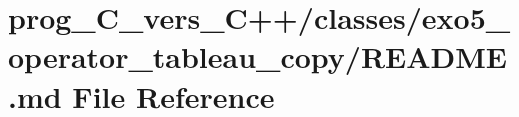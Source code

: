 \hypertarget{prog__C__vers__C_09_09_2classes_2exo5__operator__tableau__copy_2README_8md}{}\section{prog\+\_\+\+C\+\_\+vers\+\_\+\+C++/classes/exo5\+\_\+operator\+\_\+tableau\+\_\+copy/\+R\+E\+A\+D\+ME.md File Reference}
\label{prog__C__vers__C_09_09_2classes_2exo5__operator__tableau__copy_2README_8md}

